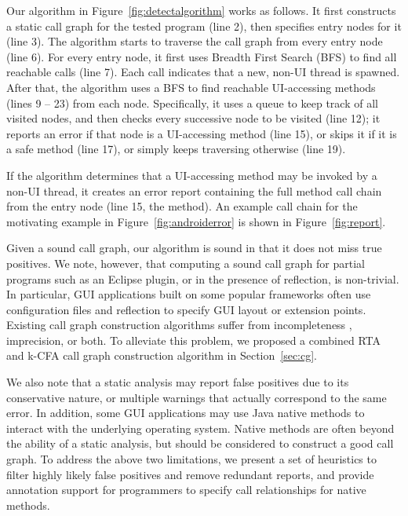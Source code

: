 Our algorithm in Figure~\ref{fig:detectalgorithm} works as follows. It
first constructs a static call graph for the tested program (line 2),
then specifies entry nodes for it (line 3). The algorithm starts to traverse
the call graph from every entry node (line 6). For every entry node,
it first uses Breadth First Search (BFS) to find all reachable
 calls (line 7). Each  call
indicates that a new, non-UI thread is spawned.  After that, 
the algorithm uses a BFS to find reachable UI-accessing methods (lines 9 -- 23)
from each  node.
Specifically, it uses a queue to keep track of all visited nodes, and
then checks every successive node to be visited (line 12);
it reports an error if that node
is a UI-accessing method (line 15), or skips it if it is
a safe method (line 17), or simply keeps traversing otherwise (line 19).

If the algorithm determines that a UI-accessing method may be invoked
by a non-UI thread, it creates an error report containing the full
method call chain from the entry node (line 15, the 
method). An example call chain for
the motivating example in Figure~\ref{fig:androiderror} is shown
in Figure~\ref{fig:report}.

Given a sound call graph, our algorithm is sound in that it does not
miss true positives. We note, however, that computing a sound
call graph for partial programs such as an Eclipse plugin,
or in the presence of reflection, is non-trivial. 
In particular, GUI applications built on some popular frameworks
often use configuration files and reflection to specify GUI layout
or extension points.
Existing call graph construction algorithms suffer from incompleteness
, imprecision, or both.  To alleviate this problem, 
we proposed a combined RTA
and k-CFA call graph construction algorithm in Section~\ref{sec:cg}.



We also note that a static analysis may report false positives due
to its conservative nature, or multiple warnings that actually correspond to
the same error. In addition, some GUI applications may use
Java native methods to interact with the underlying operating system.
Native methods are often beyond the ability of a static analysis, but
should be considered to construct a good call graph. To address the
above two limitations, we present a set of heuristics to filter
highly likely false positives and remove redundant reports, and provide
annotation support for programmers to specify call relationships for
 native methods.


